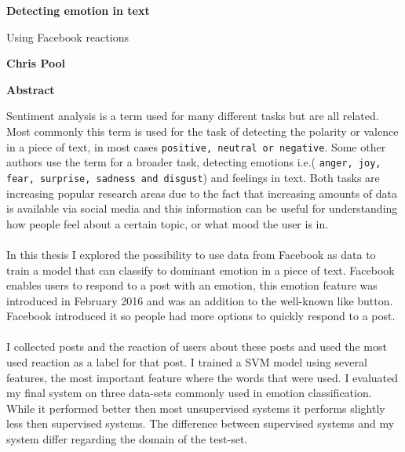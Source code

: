 \thispagestyle{plain}
\begin{center}
    \Large
    \textbf{Detecting emotion in text}
    
    \vspace{0.4cm}
    \large
    Using Facebook reactions
    
    \vspace{0.4cm}
    \textbf{Chris Pool}
    
    \vspace{0.9cm}
    \textbf{Abstract}
\end{center}
Sentiment analysis is a term used for many different tasks but are all related. Most commonly this term is used for the task of detecting the polarity or valence in a piece of text, in most cases \texttt{positive, neutral or negative}. Some other authors use the term for a broader task, detecting emotions i.e.( \texttt{anger, joy, fear, surprise, sadness and disgust}) and feelings in text. Both tasks are increasing popular research areas due to the fact that increasing amounts of data is available via social media and this information can be useful for understanding how people feel about a certain topic, or what mood the user is in.\\\\
In this thesis I explored the possibility to use data from Facebook as data to train a model that can classify to dominant emotion in a piece of text. Facebook enables users to respond to a post with an emotion, this emotion feature was introduced in February 2016 and was an addition to the well-known like button. Facebook introduced it so people had more options to quickly respond to a post.\\\\
I collected posts and the reaction of users about these posts and used the most used reaction as a label for that post. I trained a SVM model using several features, the most important feature where the words that were used. I evaluated my final system on three data-sets commonly used in emotion classification. While it performed better then most unsupervised systems it performs slightly less then supervised systems. The difference between supervised systems and my system differ regarding the domain of the test-set.\\\\





\clearpage